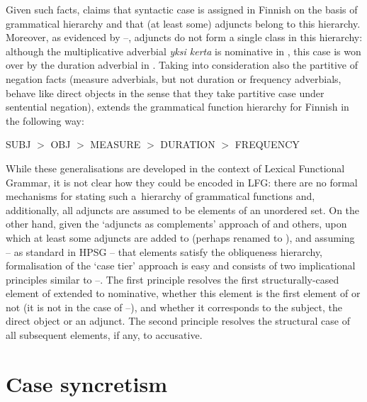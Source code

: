 \documentclass[output=paper]{langsci/langscibook}
\begin{document}
Given such facts,
\citet{mali:93} claims that syntactic case is assigned in Finnish on
the basis of grammatical hierarchy and that (at least some) adjuncts
belong to this hierarchy.  Moreover, as evidenced by
–, adjuncts do not form a single class in this
hierarchy: although the multiplicative adverbial \emph{yksi kerta} is
nominative in , this case is won over by the duration
adverbial in . Taking into consideration also the partitive
of negation facts (measure adverbials, but not duration or frequency
adverbials, behave like direct objects in the sense that they take
partitive case under sentential negation), \citet{mali:93} extends the
grammatical function hierarchy for Finnish in the following way:
\begin{examples}
\item SUBJ $>$ OBJ $>$ MEASURE $>$ DURATION $>$ FREQUENCY
\end{examples}

While these generalisations are developed in the context of Lexical Functional Grammar, it is not clear how they could be encoded in LFG: there are no formal mechanisms for stating such a~hierarchy of grammatical functions and, additionally, all adjuncts are assumed to be elements of an unordered set.  On the other hand, given the ‘adjuncts as complements’ approach of \citealt{BMS2001a-unlinked} and others, upon which at least some adjuncts are added to  (perhaps renamed to ), and assuming – as standard in HPSG – that  elements satisfy the obliqueness hierarchy, formalisation of the ‘case tier’ approach is easy and consists of two implicational principles similar to –.  The first principle resolves the first structurally-cased element of extended  to nominative, whether this element is the first element of  or not (it is not in the case of –), and whether it corresponds to the subject, the direct object or an adjunct.  The second principle resolves the structural case of all subsequent elements, if any, to accusative.






\section{Case syncretism}
\label{sec:case:syn}
\end{document}

